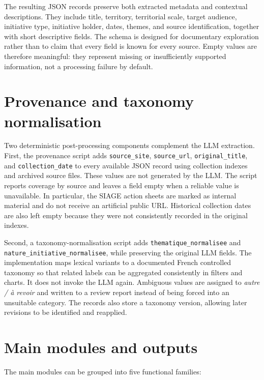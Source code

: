 \documentclass[
11pt,
english,
singlespacing,
headsepline,
]{MastersDoctoralThesis}
\begin{document}
The resulting JSON records preserve both extracted metadata and contextual
descriptions. They include title, territory, territorial scale, target
audience, initiative type, initiative holder, dates, themes, and source
identification, together with short descriptive fields. The schema is designed
for documentary exploration rather than to claim that every field is known for
every source. Empty values are therefore meaningful: they represent missing or
insufficiently supported information, not a processing failure by default.

\section{Provenance and taxonomy normalisation}

Two deterministic post-processing components complement the LLM extraction.
First, the provenance script adds \texttt{source\_site}, \texttt{source\_url},
\texttt{original\_title}, and \texttt{collection\_date} to every available JSON
record using collection indexes and archived source files. These values are not
generated by the LLM. The script reports coverage by source and leaves a field
empty when a reliable value is unavailable. In particular, the SIAGE action
sheets are marked as internal material and do not receive an artificial public
URL. Historical collection dates are also left empty because they were not
consistently recorded in the original indexes.

Second, a taxonomy-normalisation script adds
\texttt{thematique\_normalisee} and
\texttt{nature\_initiative\_normalisee}, while preserving the original LLM
fields. The implementation maps lexical variants to a documented French
controlled taxonomy so that related labels can be aggregated consistently in
filters and charts. It does not invoke the LLM again. Ambiguous values are
assigned to \textit{autre / à revoir} and written to a review report instead of
being forced into an unsuitable category. The records also store a taxonomy
version, allowing later revisions to be identified and reapplied.

\section{Main modules and outputs}

The main modules can be grouped into five functional families:
\end{document}
